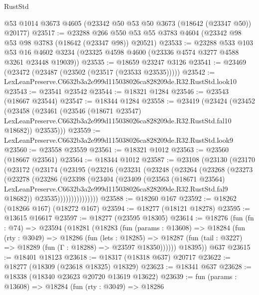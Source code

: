 \begin{lexlean}{RustStd}
\begin{coremodule}
    @53
    @1014
    @3673
    @4605
    (@23342 @50 @53 @50 @3673 (@18642 (@23347 @50)) @20177)
@23517 := @23288
    @266
    @550
    @53
    @55
    @3783
    @4604
    (@23342 @98 @53 @98 @3783 (@18642 (@23347 @98)) @20521)
@23533 := @23288
    @533
    @103
    @53
    @16
    @4602
    @3234
    (@23325 @4598 @4600 (@23336 @4574 @3277 @4588 @3261 @23448 @19039))
@23535 := @18659 @23247 @3126
@23541 := @23469 (@23472 (@23487 (@23502 (@23517 (@23533 @23535)))))
@23542 := LexLeanPreserve.C6632b3a2e999d115038026ca828209de.R32.RustStd.look10
@23543 := @23541 @23542
@23544 := @18321 @1284
@23546 := @23543 (@18667 @23544)
@23547 := @18344 @1284
@23558 := @23419
    (@23424
      (@23452
        (@23458
          (@23461
            (@23546
              (@18671 @23547)
              LexLeanPreserve.C6632b3a2e999d115038026ca828209de.R32.RustStd.fal10
              @18682))
          @23535)))
@23559 := LexLeanPreserve.C6632b3a2e999d115038026ca828209de.R32.RustStd.look9
@23560 := @23558 @23559
@23561 := @18321 @1012
@23563 := @23560 (@18667 @23561)
@23564 := @18344 @1012
@23587 := @23108
    (@23130
      (@23170
        (@23172
          (@23174
            (@23195
              (@23216
                (@23231
                  (@23248
                    (@23264
                      (@23268
                        (@23273
                          (@23278
                            (@23286
                              (@23398
                                (@23404
                                  (@23409
                                    (@23563
                                      (@18671 @23564)
                                      LexLeanPreserve.C6632b3a2e999d115038026ca828209de.R32.RustStd.fal9
                                      @18682))
                                  @23535)))))))))))))))
@23588 := @18260 @167
@23592 := @18262 (@18266 @167) (@18272 @167)
@23594 := @18277 (@18121 @18278)
@23595 := @13615 @16617
@23597 := @18277 (@23595 @18305)
@23614 := @18276
    (fun (fn : @74) =>
    @23594
      (@18281
        (@18283
          (fun (params : @13608) =>
          @18284
            (fun (rty : @3049) =>
            @18286
              (fun (lets : @18285) =>
              @18287 (fun (tail : @3227) => @18289 (fun (Γ : @18288) => @23597 @18350))))))
        @18395))
    @637
@23615 := @18401 @18123
@23618 := @18317 (@18318 @637) @20717
@23622 := @18277 (@18309 (@23618 @18325) @18329)
@23623 := @18341 @637
@23628 := @18338 (@18340 @23623 @20720 @13619 @13622)
@23639 := fun (params : @13608) =>
  @18284
    (fun (rty : @3049) =>
    @18286

\end{coremodule}
\end{lexlean}
